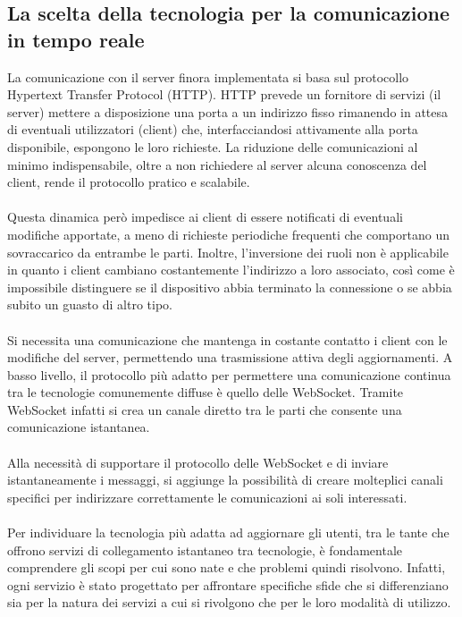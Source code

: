 \subsection{La scelta della tecnologia per la comunicazione in tempo reale}
La comunicazione con il server finora implementata 
si basa sul protocollo Hypertext Transfer Protocol (HTTP). 
HTTP prevede un fornitore di servizi (il server) mettere a disposizione una porta 
a un indirizzo fisso rimanendo in attesa di eventuali utilizzatori (client) che, 
interfacciandosi attivamente alla porta disponibile, espongono le loro richieste.
La riduzione delle comunicazioni al minimo indispensabile, 
oltre a non richiedere al server alcuna conoscenza del client, 
rende il protocollo pratico e scalabile.\\
\\
Questa dinamica però impedisce ai client di essere notificati di eventuali modifiche apportate, 
a meno di richieste periodiche frequenti che comportano un sovraccarico da entrambe le parti. 
Inoltre, l’inversione dei ruoli non è applicabile 
in quanto i client cambiano costantemente l’indirizzo a loro associato, 
così come è impossibile distinguere se il dispositivo abbia terminato la connessione
o se abbia subito un guasto di altro tipo. \\
\\
Si necessita una comunicazione che mantenga in costante contatto 
i client con le modifiche del server, 
permettendo una trasmissione attiva degli aggiornamenti.
A basso livello, il protocollo più adatto per permettere una comunicazione continua 
tra le tecnologie comunemente diffuse è quello delle WebSocket. 
Tramite WebSocket infatti si crea un canale diretto tra le parti 
che consente una comunicazione istantanea.\\
\\
Alla necessità di supportare il protocollo delle WebSocket e di inviare istantaneamente i messaggi,
si aggiunge la possibilità di creare molteplici canali specifici 
per indirizzare correttamente le comunicazioni ai soli interessati.\\
\\
Per individuare la tecnologia più adatta ad aggiornare gli utenti, 
tra le tante che offrono servizi di collegamento istantaneo tra tecnologie, 
è fondamentale comprendere  gli scopi per cui sono nate e che problemi quindi risolvono. 
Infatti, ogni servizio è stato progettato per affrontare specifiche sfide che si differenziano 
sia per la natura dei servizi a cui si rivolgono che per le loro modalità di utilizzo.\\
